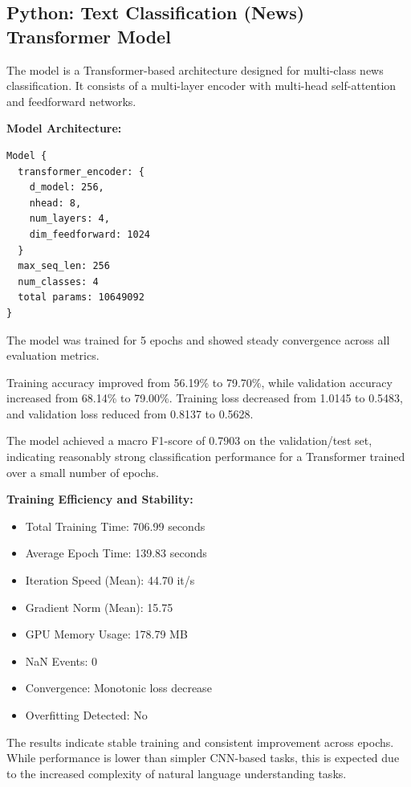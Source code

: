 \documentclass{ieeeaccess}
\begin{document}
\subsection{Python: Text Classification (News) Transformer Model}

The model is a Transformer-based architecture designed for multi-class news classification. It consists of a multi-layer encoder with multi-head self-attention and feedforward networks.

\textbf{Model Architecture:}

\begin{lstlisting}
Model {
  transformer_encoder: {
    d_model: 256,
    nhead: 8,
    num_layers: 4,
    dim_feedforward: 1024
  }
  max_seq_len: 256
  num_classes: 4
  total params: 10649092
}
\end{lstlisting}

The model was trained for 5 epochs and showed steady convergence across all evaluation metrics.

Training accuracy improved from 56.19\% to 79.70\%, while validation accuracy increased from 68.14\% to 79.00\%. 
Training loss decreased from 1.0145 to 0.5483, and validation loss reduced from 0.8137 to 0.5628.

The model achieved a macro F1-score of 0.7903 on the validation/test set, indicating reasonably strong classification performance for a Transformer trained over a small number of epochs.



\textbf{Training Efficiency and Stability:}
\begin{itemize}
    \item Total Training Time: 706.99 seconds
    \item Average Epoch Time: 139.83 seconds
    \item Iteration Speed (Mean): 44.70 it/s
    \item Gradient Norm (Mean): 15.75
    \item GPU Memory Usage: 178.79 MB
    \item NaN Events: 0
    \item Convergence: Monotonic loss decrease
    \item Overfitting Detected: No
\end{itemize}

The results indicate stable training and consistent improvement across epochs. While performance is lower than simpler CNN-based tasks, this is expected due to the increased complexity of natural language understanding tasks.
\end{document}
